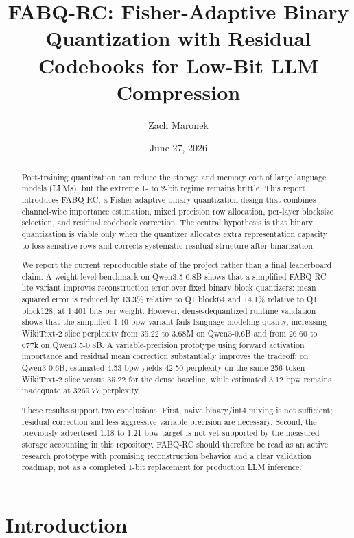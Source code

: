 \documentclass[11pt]{article}
\title{FABQ-RC: Fisher-Adaptive Binary Quantization with Residual Codebooks for Low-Bit LLM Compression}
\author{Zach Maronek}
\date{June 27, 2026}
\begin{document}
\maketitle

\begin{abstract}
Post-training quantization can reduce the storage and memory cost of large language models (LLMs), but the extreme 1- to 2-bit regime remains brittle. This report introduces FABQ-RC, a Fisher-adaptive binary quantization design that combines channel-wise importance estimation, mixed precision row allocation, per-layer blocksize selection, and residual codebook correction. The central hypothesis is that binary quantization is viable only when the quantizer allocates extra representation capacity to loss-sensitive rows and corrects systematic residual structure after binarization.

We report the current reproducible state of the project rather than a final leaderboard claim. A weight-level benchmark on Qwen3.5-0.8B shows that a simplified FABQ-RC-lite variant improves reconstruction error over fixed binary block quantizers: mean squared error is reduced by 13.3\% relative to Q1 block64 and 14.1\% relative to Q1 block128, at 1.401 bits per weight. However, dense-dequantized runtime validation shows that the simplified 1.40 bpw variant fails language modeling quality, increasing WikiText-2 slice perplexity from 35.22 to 3.68M on Qwen3-0.6B and from 26.60 to 677k on Qwen3.5-0.8B. A variable-precision prototype using forward activation importance and residual mean correction substantially improves the tradeoff: on Qwen3-0.6B, estimated 4.53 bpw yields 42.50 perplexity on the same 256-token WikiText-2 slice versus 35.22 for the dense baseline, while estimated 3.12 bpw remains inadequate at 3269.77 perplexity.

These results support two conclusions. First, naive binary/int4 mixing is not sufficient; residual correction and less aggressive variable precision are necessary. Second, the previously advertised 1.18 to 1.21 bpw target is not yet supported by the measured storage accounting in this repository. FABQ-RC should therefore be read as an active research prototype with promising reconstruction behavior and a clear validation roadmap, not as a completed 1-bit replacement for production LLM inference.
\end{abstract}

\section{Introduction}
\end{document}

